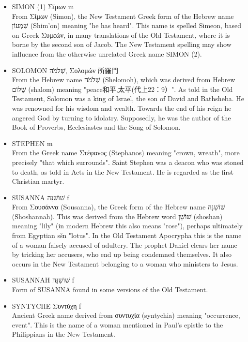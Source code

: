 \begin{itemize}
From Συμεών (Symeon), the Old Testament Greek form of the Hebrew name Shim'on (see SIMON (1)). In the Old Testament this is the name of the second son of Jacob and Leah and the founder of one of the twelve tribes of Israel. In the New Testament the Greek rendering Σίμων (Simon) is more common, though Συμεών occurs belonging to a man who blessed the newborn Jesus. 
\item SIMON (1) Σίμων m \\
From Σίμων (Simon), the New Testament Greek form of the Hebrew name שִׁמְעוֹן (Shim'on) meaning "he has heard". This name is spelled Simeon, based on Greek Συμεών, in many translations of the Old Testament, where it is borne by the second son of Jacob. The New Testament spelling may show influence from the otherwise unrelated Greek name SIMON (2).
\item SOLOMON שְׁלֹמֹה, Σολομών 所羅門\\
From the Hebrew name שְׁלֹמֹה (Shelomoh), which was derived from Hebrew שָׁלוֹם (shalom) meaning "peace和平,太平(代上22：9）". As told in the Old Testament, Solomon was a king of Israel, the son of David and Bathsheba. He was renowned for his wisdom and wealth. Towards the end of his reign he angered God by turning to idolatry. Supposedly, he was the author of the Book of Proverbs, Ecclesiastes and the Song of Solomon.
\item STEPHEN m \\
From the Greek name Στέφανος (Stephanos) meaning "crown, wreath", more precisely "that which surrounds". Saint Stephen was a deacon who was stoned to death, as told in Acts in the New Testament. He is regarded as the first Christian martyr. 
\item SUSANNA שׁוֹשַׁנָּה f \\
From Σουσάννα (Sousanna), the Greek form of the Hebrew name שׁוֹשַׁנָּה (Shoshannah). This was derived from the Hebrew word שׁוֹשָׁן (shoshan) meaning "lily" (in modern Hebrew this also means "rose"), perhaps ultimately from Egyptian sšn "lotus". In the Old Testament Apocrypha this is the name of a woman falsely accused of adultery. The prophet Daniel clears her name by tricking her accusers, who end up being condemned themselves. It also occurs in the New Testament belonging to a woman who ministers to Jesus.
\item SUSANNAH שׁוֹשַׁנָּה f \\
Form of SUSANNA found in some versions of the Old Testament.
\item SYNTYCHE Συντύχη f\\
Ancient Greek name derived from συντυχία (syntychia) meaning "occurrence, event". This is the name of a woman mentioned in Paul's epistle to the Philippians in the New Testament.
\end{itemize}

